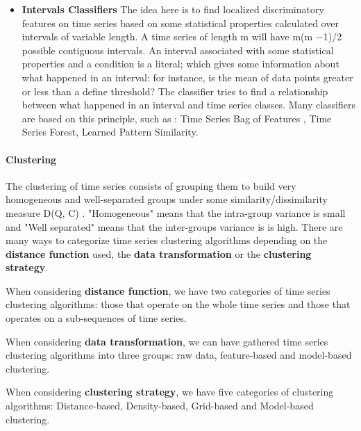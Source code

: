 \begin{itemize}
\item \textbf{Intervals Classifiers} The idea here is to find localized discriminatory features on time series based on some statistical properties calculated over intervals of variable length. A time series of length m will have m(m −1)/2 possible contiguous intervals. An interval associated with some statistical properties and a condition is a literal; which gives some information about what happened in an interval: for instance, is the mean of data points greater or less than a define threshold? The classifier tries to find a relationship between what happened in an interval and  time series classes. Many classifiers are based on this principle, such as : Time Series Bag of Features \cite{baydogan2013bag}, Time Series Forest\cite{deng2013time}, Learned Pattern Similarity\cite{baydogan2016time}.
\end{itemize}


\paragraph{Clustering}
The clustering of time series consists of grouping them to build very homogeneous and well-separated groups under some similarity/dissimilarity measure D(Q, C) \cite{rani2012recent}. "Homogeneous" means that the intra-group variance is small and "Well separated" means that the inter-groups variance is is high. There are many ways to categorize time series clustering algorithms depending on the \textbf{distance function} used, the \textbf{data transformation} or  the \textbf{clustering strategy}. 


When considering \textbf{distance function}, we have two categories of time series clustering algorithms: those that operate on the whole time series and those that operates on a sub-sequences of time series.


 When considering \textbf{data transformation}, we can have gathered time series clustering algorithms into three groups:  raw data, feature-based and model-based clustering. 


When considering \textbf{clustering strategy}, we have five categories of clustering algorithms: Distance-based, Density-based, Grid-based and Model-based clustering. 


